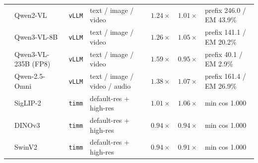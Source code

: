 \begin{table}[H]
{\begin{tabular}{@{}ll>{\raggedright\arraybackslash}p{1.55cm}>{\raggedright\arraybackslash}p{2.6cm}cc>{\raggedright\arraybackslash}p{2.35cm}@{}}
       & Qwen2-VL & \texttt{vLLM} & text / image / video & $1.24\times$ & $1.01\times$ & prefix 246.0 / EM 43.9\% \\
       & Qwen3-VL-8B & \texttt{vLLM} & text / image / video & $1.26\times$ & $1.05\times$ & prefix 141.1 / EM 20.2\% \\
       & Qwen3-VL-235B (FP8) & \texttt{vLLM} & text / image / video & $1.59\times$ & $0.95\times$ & prefix 40.1 / EM 2.9\% \\
       & Qwen-2.5-Omni & \texttt{vLLM} & text / image / video / audio & $1.38\times$ & $1.07\times$ & prefix 161.4 / EM 26.9\% \\
       & SigLIP-2 & \texttt{timm} & default-res + high-res & $1.01\times$ & $1.06\times$ & min cos 1.000 \\
       & DINOv3 & \texttt{timm} & default-res + high-res & $0.94\times$ & $0.94\times$ & min cos 1.000 \\
       & SwinV2 & \texttt{timm} & default-res + high-res & $0.94\times$ & $0.91\times$ & min cos 1.000 \\
      \bottomrule
      \end{tabular}%
      }
  \end{table}

